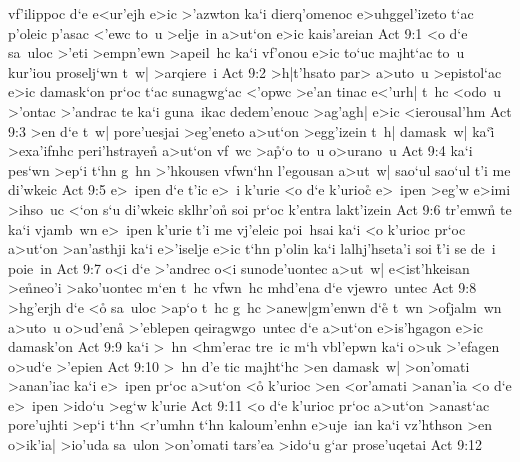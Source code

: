 vf'ilippoc
d`e
e<ur'ejh
e>ic
>'azwton
ka`i
dierq'omenoc
e>uhggel'izeto
t`ac
p'oleic
p'asac
<'ewc
to~u
>elje~in
a>ut`on
e>ic
kais'areian\bibvsend
\vs Act 9:1
<o
d`e
sa~uloc
>'eti
>empn'ewn
>apeil~hc
ka`i
vf'onou
e>ic
to`uc
majht`ac
to~u
kur'iou
proselj`wn
t~w|
>arqiere~i\bibvsend
\vs Act 9:2
>h|t'hsato
par>
a>uto~u
>epistol`ac
e>ic
damask`on
pr`oc
t`ac
sunagwg`ac
<'opwc
>e'an
tinac
e<'urh|
t~hc
<odo~u
>'ontac
>'andrac
te
ka`i
guna~ikac
dedem'enouc
>ag'agh|
e>ic
<ierousal'hm\bibvsend
\vs Act 9:3
>en
d`e
t~w|
pore'uesjai
>eg'eneto
a>ut`on
>egg'izein
t~h|
damask~w|
ka`i\r{}
>exa'ifnhc
peri'hstrayen\r{}
a>ut`on
vf~wc
>a\r{p}`o
to~u
o>urano~u\bibvsend
\vs Act 9:4
ka`i
pes`wn
>ep`i
t`hn
g~hn
>'hkousen
vfwn`hn
l'egousan
a>ut~w|
sao`ul
sao`ul
t'i
me
di'wkeic\bibvsend
\vs Act 9:5
e>~ipen
d`e
t'ic
e>~i
k'urie
<o
d`e
k'urioc\r{}
e>~ipen
>eg'w
e>imi
>ihso~uc
<`on
s`u
di'wkeic
sklhr'on\r{}
soi
pr`oc
k'entra
lakt'izein\bibvsend
\vs Act 9:6
tr'emwn\r{}
te
ka`i
vjamb~wn
e>~ipen
k'urie
t'i
me
vj'eleic
poi~hsai
ka`i
<o
k'urioc
pr`oc
a>ut`on
>an'asthji
ka`i
e>'iselje
e>ic
t`hn
p'olin
ka`i
lalhj'hseta'i
soi
\r{t}'i
se
de~i
poie~in\bibvsend
\vs Act 9:7
o<i
d`e
>'andrec
o<i
sunode'uontec
a>ut~w|
e<ist'hkeisan
>e\r{n}neo'i
>ako'uontec
m`en
t~hc
vfwn~hc
mhd'ena
d`e
vjewro~untec\bibvsend
\vs Act 9:8
>hg'erjh
d`e
<o\r{}
sa~uloc
>ap`o
t~hc
g~hc
>anew|gm'enwn
d`e\r{}
t~wn
>ofjalm~wn
a>uto~u
o>ud'en\r{a}
>'eblepen
qeiragwgo~untec
d`e
a>ut`on
e>is'hgagon
e>ic
damask'on\bibvsend
\vs Act 9:9
ka`i
>~hn
<hm'erac
tre~ic
m`h
vbl'epwn
ka`i
o>uk
>'efagen
o>ud`e
>'epien\bibvsend
\vs Act 9:10
>~hn
d'e
tic
majht`hc
>en
damask~w|
>on'omati
>anan'iac
ka`i
e>~ipen
pr`oc
a>ut`on
<o\r{}
k'urioc
>en
<or'amati
>anan'ia
<o
d`e
e>~ipen
>ido`u
>eg`w
k'urie\bibvsend
\vs Act 9:11
<o
d`e
k'urioc
pr`oc
a>ut`on
>anast`ac
pore'ujhti
>ep`i
t`hn
<r'umhn
t`hn
kaloum'enhn
e>uje~ian
ka`i
vz'hthson
>en
o>ik'ia|
>io'uda
sa~ulon
>on'omati
tars'ea
>ido`u
g`ar
prose'uqetai\bibvsend
\vs Act 9:12
